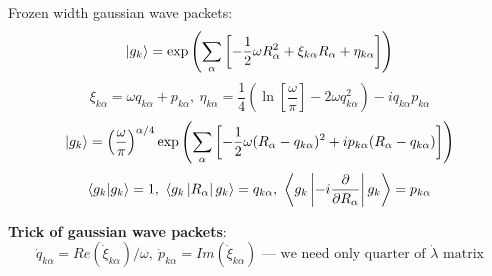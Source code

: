 \begin{frame}{}
\begin{block}{Frozen width gaussian wave packets:}
$$\myvec{g_k}=\myexp{\sum_{\alpha}\left[-\frac{1}{2}\omega R_{\alpha}^2 + %
							\xi_{k\alpha}R_{\alpha} + %
							\eta_{k\alpha} \right]}$$
$$\xi_{k\alpha}=\omega q_{k\alpha} + p_{k\alpha},\ %
\eta_{k\alpha}=\frac{1}{4}\left( \ln\left[\frac{\omega}{\pi}\right] - 2\omega q_{k\alpha}^2\right) - iq_{k\alpha}p_{k\alpha}$$
$$\myvec{g_k}=\left(\frac{\omega}{\pi}\right)^{\alpha/4}%
	      \myexp{\sum_{\alpha}\left[-\frac{1}{2}\omega(R_{\alpha}-q_{k\alpha})^2 + %
						       ip_{k\alpha}(R_{\alpha}-q_{k\alpha}) \right]}$$
$$\myel{g_k}{g_k} = 1,\ %
  \mymean{g_k}{R_{\alpha}}{g_k} = q_{k\alpha},\ %
  \mymean{g_k}{-i\frac{\partial}{\partial R_{\alpha}}}{g_k} = p_{k\alpha}$$
\end{block}
\textbf{Trick of gaussian wave packets}:\\
$$\dot{q}_{k\alpha} = \mathit{Re}(\dot{\xi}_{k\alpha})/\omega,\ \dot{p}_{k\alpha}=\mathit{Im}(\dot{\xi}_{k\alpha})\text{ --- we need only quarter of $\dot{\lambda}$ matrix}$$
\end{frame}


